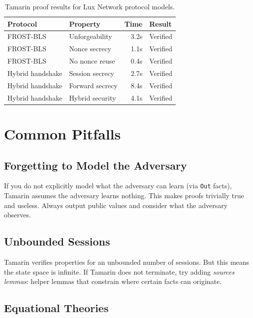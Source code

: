 \documentclass[11pt,a4paper]{article}
\begin{document}
\begin{table}[H]
\centering
\small
\begin{tabular}{@{}llrl@{}}
\toprule
\textbf{Protocol} & \textbf{Property} & \textbf{Time} & \textbf{Result} \\
\midrule
FROST-BLS & Unforgeability & 3.2s & Verified \\
FROST-BLS & Nonce secrecy & 1.1s & Verified \\
FROST-BLS & No nonce reuse & 0.4s & Verified \\
Hybrid handshake & Session secrecy & 2.7s & Verified \\
Hybrid handshake & Forward secrecy & 8.4s & Verified \\
Hybrid handshake & Hybrid security & 4.1s & Verified \\
\bottomrule
\end{tabular}
\caption{Tamarin proof results for Lux Network protocol models.}
\end{table}

\section{Common Pitfalls}

\subsection{Forgetting to Model the Adversary}

If you do not explicitly model what the adversary can learn (via \texttt{Out} facts),
Tamarin assumes the adversary learns nothing. This makes proofs trivially true and
useless. Always output public values and consider what the adversary observes.

\subsection{Unbounded Sessions}

Tamarin verifies properties for an unbounded number of sessions. But this means the
state space is infinite. If Tamarin does not terminate, try adding \emph{sources lemmas}:
helper lemmas that constrain where certain facts can originate.

\subsection{Equational Theories}
\end{document}
